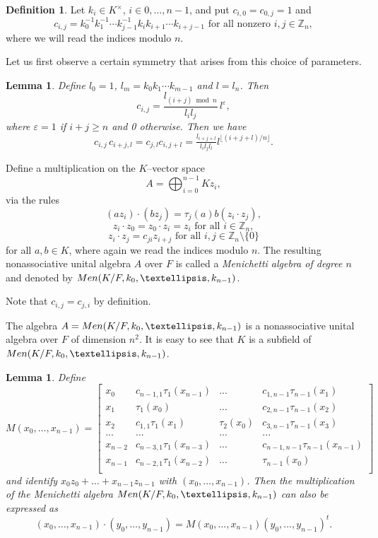 \documentclass[11pt]{amsart}
\theoremstyle{plain}
\newtheorem{lemma}[theorem]{Lemma}
\theoremstyle{definition}
\newtheorem{definition}[theorem]{Definition}
\begin{document}
\begin{definition}
Let $k_i\in K^\times$, $i\in 0,\dots,{n-1}$, and put $c_{i,0}=c_{0,j}=1$ and
$$c_{i,j}=k_0^{-1}k_1^{-1} \cdots    k_{j-1}^{-1}   k_ik_{i+1}\cdots k_{i+j-1} \text{ for all nonzero } i,j\in \mathbb{Z}_n,$$
where we will read the indices modulo $n$.

Let us first observe a certain symmetry that arises from this choice of parameters.
\begin{lemma}\label{le:sym}
Define $l_0=1$, $l_m=k_0k_1\cdots k_{m-1}$ and $l=l_n$. Then
$$
  c_{i,j}=\frac{l_{(i+j)\bmod n}}{l_il_j}\,l^{\varepsilon},
$$
where $\varepsilon=1$ if $i+j\ge n$ and 0 otherwise.
Then we have
$$
  c_{i,j}\,c_{i+j,l}=c_{j,l}c_{i,j+l}=\tfrac{l_{i+j+l}}{l_il_jl_l}
  l^{\lfloor (i+j+l)/n\rfloor}.$$
\end{lemma}

Define a multiplication on the $K$–vector space
\[
A = \bigoplus_{i=0}^{n-1} K z_{i},
\]
 via the rules
$$(az_i)\cdot  (bz_j)=\tau_j(a)b (z_i\cdot  z_j),$$
$$z_i\cdot  z_0=z_0\cdot  z_i =z_i \text{ for all } i\in\mathbb{Z}_n,$$
$$z_i\cdot  z_j=c_{ji}z_{i+j} \text{ for all } i,j\in\mathbb{Z}_n\setminus \{0\}$$
for all $a,b\in K$, where again we read the indices modulo $n$.
The resulting  nonassociative unital algebra $A$ over $F$  is called a \emph{Menichetti algebra of degree $n$} and denoted by ${\rm Men}(K/F, k_0,\dots,k_{n-1})$.
\end{definition}

Note that $c_{i,j}=c_{j,i}$ by definition.

The algebra $A={\rm Men}(K/F, k_0,\dots,k_{n-1})$ is a nonassociative unital algebra over $F$ of dimension $n^2$.  It is easy to see that $K$ is a subfield of ${\rm Men}(K/F, k_0,\dots,k_{n-1})$.



\begin{lemma}
Define
\begin{equation}\label{equ:1}
 M(x_0,\dots,x_{n-1})=\left [\begin {array}{cccccc}
x_0 &  c_{{n-1},1}\tau_1(x_{n-1}) & ... & c_{1,{n-1}} \tau_{n-1}(x_{1})\\
x_1 & \tau_1(x_0) & ... &  c_{2,{n-1}} \tau_{n-1}(x_{2})\\
x_2 & c_{1,1}\tau_1(x_{1}) & \tau_2(x_0) & c_{3,{n-1}} \tau_{n-1}(x_{3})\\
...& ...  & ... & ...\\
x_{n-2} &  c_{n-3,1}\tau_1(x_{n-3})  & ...& c_{{n-1},{n-1}} \tau_{n-1}(x_{n-1})\\
x_{n-1} &  c_{n-2,1}\tau_1(x_{n-2})  & ...& \tau_{n-1}(x_{0})\\
\end {array}\right ]
 \end{equation}
and identify $x_0z_0+\dots +x_{n-1}z_{n-1}$ with $(x_0,\dots,x_{n-1})$. Then the multiplication of the Menichetti algebra
 ${\rm Men}(K/F, k_0,\dots,k_{n-1})$ can also be expressed as
 $$(x_0,\dots,x_{n-1})\cdot  (y_0,\dots,y_{n-1})=M(x_0,\dots,x_{n-1})(y_0,\dots,y_{n-1})^t.$$
\end{lemma}
\end{document}
